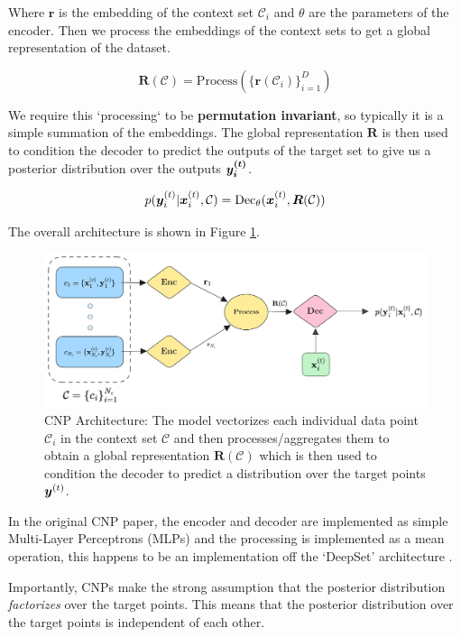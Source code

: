 \documentclass[../../main.tex]{subfiles}
\begin{document}
Where $\bm{r}$ is the embedding of the context set $\mathcal{C}_i$ and $\theta$ are the parameters of the encoder. Then we process the embeddings of the context sets to get a global representation of the dataset. 

\begin{equation}
    \bm{R}(\mathcal{C}) = \text{Process}(\{ \bm{r}(\mathcal{C}_i) \}_{i=1}^D)
\end{equation}

We require this `processing` to be \textbf{permutation invariant}, so typically it is a simple summation of the embeddings. The global representation $\bm{R}$ is then used to condition the decoder to predict the outputs of the target set to give us a posterior distribution over the outputs $\bm{y_i^{(t)}}$.

\begin{equation}
    p(\bm{y}_i^{(t)} | \bm{x}_i^{(t)}, \mathcal{C}) = \text{Dec}_\theta(\bm{x}_i^{(t)}, \bm{R}(\mathcal{C}))
\end{equation}

The overall architecture is shown in Figure \ref{fig:cnp-architecture}.

\begin{figure}[H]
	\centering
	\includegraphics[height=0.3\textwidth]{./cnp.png}
	\caption{CNP Architecture: The model vectorizes each individual data point $\mathcal{C}_i$ in the context set $\mathcal{C}$ and then processes/aggregates them to obtain a global representation $\bm{R}(\mathcal{C})$ which is then used to condition the decoder to predict a distribution over the target points $\bm{y}^{(t)}$.}
    \label{fig:cnp-architecture}
\end{figure}


In the original CNP paper, the encoder and decoder are implemented as simple Multi-Layer Perceptrons (MLPs) and the processing is implemented as a mean operation, this happens to be an implementation off the `DeepSet' architecture \parencite{zaheer2018deep}.


Importantly, CNPs make the strong assumption that the posterior distribution \emph{factorizes} over the target points. This means that the posterior distribution over the target points is independent of each other. 
\end{document}
